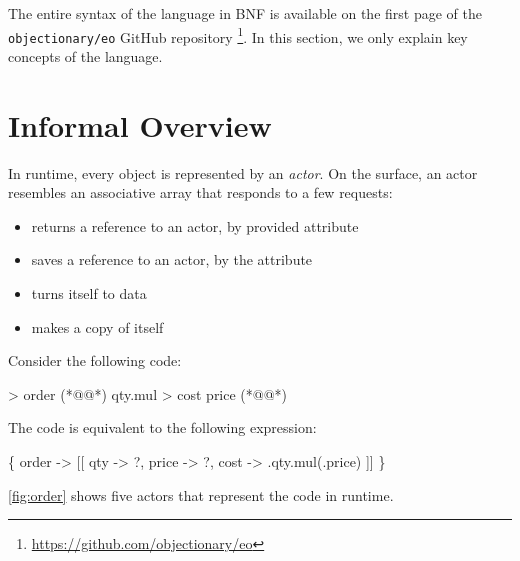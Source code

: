


The entire syntax of the \eolang{} language in BNF is available on the first page of the \texttt{objectionary/eo} GitHub repository%
  \footnote{\url{https://github.com/objectionary/eo}}.
In this section, we only explain key concepts of the language.

\section{Informal Overview}

In \eolang{} runtime, every object is represented by an \emph{actor}.
On the surface, an actor resembles an associative array that responds to a few requests:
\begin{itemize}
  \item {} returns a reference to an actor, by provided attribute
  \item {} saves a reference to an actor, by the attribute
  \item {} turns itself to data
  \item {} makes a copy of itself
\end{itemize}

Consider the following code:

\begin{ffcode}
 > order (*@\label{ln:order-start}@*)
  qty.mul > cost
    price (*@\label{ln:order-stop}@*)
\end{ffcode}

The code is equivalent to the following \phic{} expression:
\begin{phiquation}
\Big\{ order -> [[ qty -> ?, price -> ?, cost -> \xi.qty.mul(\xi.price) ]] \Big\}
\end{phiquation}

\cref{fig:order} shows five actors that represent the code in runtime.

